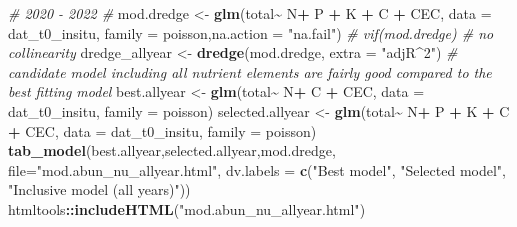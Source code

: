 \documentclass[
]{article}
\newenvironment{Shaded}{\begin{snugshade}}{\end{snugshade}}
\newcommand{\AttributeTok}[1]{\textcolor[rgb]{0.13,0.29,0.53}{#1}}
\newcommand{\CommentTok}[1]{\textcolor[rgb]{0.56,0.35,0.01}{\textit{#1}}}
\newcommand{\FunctionTok}[1]{\textcolor[rgb]{0.13,0.29,0.53}{\textbf{#1}}}
\newcommand{\NormalTok}[1]{#1}
\newcommand{\OtherTok}[1]{\textcolor[rgb]{0.56,0.35,0.01}{#1}}
\newcommand{\SpecialCharTok}[1]{\textcolor[rgb]{0.81,0.36,0.00}{\textbf{#1}}}
\newcommand{\StringTok}[1]{\textcolor[rgb]{0.31,0.60,0.02}{#1}}
\begin{document}
\begin{Shaded}
\begin{Highlighting}[]
\CommentTok{\# 2020 {-} 2022 \#}
\NormalTok{mod.dredge }\OtherTok{\textless{}{-}} \FunctionTok{glm}\NormalTok{(total}\SpecialCharTok{\textasciitilde{}}\NormalTok{ N}\SpecialCharTok{+}\NormalTok{ P }\SpecialCharTok{+}\NormalTok{ K }\SpecialCharTok{+}\NormalTok{ C }\SpecialCharTok{+}\NormalTok{ CEC, }\AttributeTok{data =}\NormalTok{ dat\_t0\_insitu, }\AttributeTok{family =}\NormalTok{ poisson,}\AttributeTok{na.action =} \StringTok{"na.fail"}\NormalTok{)}
\CommentTok{\# vif(mod.dredge) \# no collinearity}
\NormalTok{dredge\_allyear }\OtherTok{\textless{}{-}} \FunctionTok{dredge}\NormalTok{(mod.dredge, }\AttributeTok{extra =} \StringTok{"adjR\^{}2"}\NormalTok{) }\CommentTok{\# candidate model including all nutrient elements are fairly good compared to the best fitting model}
\NormalTok{best.allyear }\OtherTok{\textless{}{-}} \FunctionTok{glm}\NormalTok{(total}\SpecialCharTok{\textasciitilde{}}\NormalTok{ N}\SpecialCharTok{+}\NormalTok{ C }\SpecialCharTok{+}\NormalTok{ CEC, }\AttributeTok{data =}\NormalTok{ dat\_t0\_insitu, }\AttributeTok{family =}\NormalTok{ poisson)}
\NormalTok{selected.allyear }\OtherTok{\textless{}{-}} \FunctionTok{glm}\NormalTok{(total}\SpecialCharTok{\textasciitilde{}}\NormalTok{ N}\SpecialCharTok{+}\NormalTok{ P }\SpecialCharTok{+}\NormalTok{ K }\SpecialCharTok{+}\NormalTok{ C }\SpecialCharTok{+}\NormalTok{ CEC, }\AttributeTok{data =}\NormalTok{ dat\_t0\_insitu, }\AttributeTok{family =}\NormalTok{ poisson)}
\FunctionTok{tab\_model}\NormalTok{(best.allyear,selected.allyear,mod.dredge, }\AttributeTok{file=}\StringTok{"mod.abun\_nu\_allyear.html"}\NormalTok{,  }\AttributeTok{dv.labels =} \FunctionTok{c}\NormalTok{(}\StringTok{"Best model"}\NormalTok{, }\StringTok{"Selected model"}\NormalTok{, }\StringTok{"Inclusive model (all years)"}\NormalTok{))}
\NormalTok{htmltools}\SpecialCharTok{::}\FunctionTok{includeHTML}\NormalTok{(}\StringTok{"mod.abun\_nu\_allyear.html"}\NormalTok{)}


\end{Highlighting}
\end{Shaded}
\end{document}
